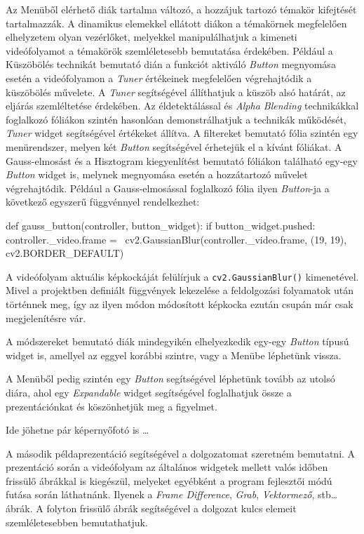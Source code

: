Az Menüből elérhető diák tartalma változó, a hozzájuk tartozó témakör kifejtését tartalmazzák. A dinamikus elemekkel ellátott diákon a témakörnek megfelelően elhelyzetem olyan vezérlőket, melyekkel manipulálhatjuk a kimeneti videófolyamot a témakörök szemléletesebb bemutatása érdekében.
Például a Küszöbölés technikát bemutató dián a funkciót aktiváló \textit{Button} megnyomása esetén a videófolyamon a \textit{Tuner} értékeinek megfelelően végrehajtódik a küszöbölés művelete. A \textit{Tuner} segítségével állíthatjuk a küszöb alsó határát, az eljárás szemléltetése érdekében.
Az éldetektálással és \textit{Alpha Blending} technikákkal foglalkozó fóliákon szintén hasonlóan demonstrálhatjuk a technikák működését, \textit{Tuner} widget segítségével értékeket állítva.
A filtereket bemutató fólia szintén egy menürendszer, melyen két \textit{Button} segítségével érhetejük el a kívánt fóliákat. A Gauss-elmosást és a Hisztogram kiegyenlítést bemutató fóliákon található egy-egy \textit{Button} widget is, melynek megnyomása esetén a hozzátartozó művelet végrehajtódik. Például a Gauss-elmosással foglalkozó fólia ilyen \textit{Button}-ja a következő egyszerű függvénnyel rendelkezhet:
\begin{python}
def gauss_button(controller, button_widget):
    if button_widget.pushed:
        controller._video.frame = \
        		cv2.GaussianBlur(controller._video.frame,
					(19, 19),
					cv2.BORDER_DEFAULT)
\end{python}
A videófolyam aktuális képkockáját felülírjuk a \texttt{cv2.GaussianBlur()} kimenetével. Mivel a projektben definiált függvények lekezelése a feldolgozási folyamatok után történnek meg, így az ilyen módon módosított képkocka ezután csupán már csak megjelenítésre vár.

A módszereket bemutató diák mindegyikén elhelyezkedik egy-egy \textit{Button} típusú widget is, amellyel az eggyel korábbi szintre, vagy a Menübe léphetünk vissza.

A Menüből pedig szintén egy \textit{Button} segítségével léphetünk tovább az utolsó diára, ahol egy \textit{Expandable} widget segítségével foglalhatjuk össze a prezentációnkat és köszönhetjük meg a figyelmet.

Ide jöhetne pár képernyőfotó is \ldots


A második példaprezentáció segítségével a dolgozatomat szeretném bemutatni.
A prezentáció során a videófolyam az általános widgetek mellett valós időben frissülő ábrákkal is kiegészül, melyeket egyébként a program fejlesztői módú futása során láthatnánk. Ilyenek a \textit{Frame Difference}, \textit{Grab}, \textit{Vektormező}, stb\ldots ábrák. A folyton frissülő ábrák segítségével a dolgozat kulcs elemeit szemléletesebben bemutathatjuk.

